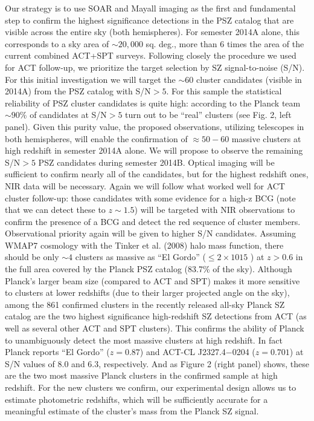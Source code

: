 \documentclass[apj, revtex4]{emulateapj}
\begin{document}
Our strategy is to use SOAR and Mayall imaging as the first and fundamental step to confirm
the highest significance detections in the PSZ catalog that are visible across the entire sky (both
hemispheres). For semester 2014A alone, this corresponds to a sky area of $\sim20,000$ sq. deg., more
than 6 times the area of the current combined ACT+SPT surveys. Following closely the procedure
we used for ACT follow-up, we prioritize the target selection by SZ signal-to-noise (S/N). For this
initial investigation we will target the $\sim60$ cluster candidates (visible in 2014A) from the PSZ
catalog with S/N$>5$. For this sample the statistical reliability of PSZ cluster candidates is quite
high: according to the Planck team $\sim90$\% of candidates at S/N$>5$ turn out to be “real” clusters
(see Fig. 2, left panel). Given this purity value, the proposed observations, utilizing telescopes in
both hemispheres, will enable the confirmation of $\approx 50 − 60$ massive clusters at high redshift in
semester 2014A alone. We will propose to observe the remaining S/N$>5$ PSZ candidates during
semester 2014B.
Optical imaging will be sufficient to confirm nearly all of the candidates, but for the highest redshift
ones, NIR data will be necessary. Again we will follow what worked well for ACT cluster follow-up:
those candidates with some evidence for a high-z BCG (note that we can detect these to $z \sim 1.5$)
will be targeted with NIR observations to confirm the presence of a BCG and detect the red
sequence of cluster members. Observational priority again will be given to higher S/N candidates.
Assuming WMAP7 cosmology with the Tinker et al. (2008) halo mass function, there should be
only $\sim4$ clusters as massive as “El Gordo” ($\leq 2 \times 10 15$ \Msol) at $z > 0.6$ in the full area covered by
the Planck PSZ catalog (83.7\% of the sky). Although Planck’s larger beam size (compared to ACT
and SPT) makes it more sensitive to clusters at lower redshifts (due to their larger projected angle
on the sky), among the 861 confirmed clusters in the recently released all-sky Planck SZ catalog are
the two highest significance high-redshift SZ detections from ACT (as well as several other ACT
and SPT clusters). This confirms the ability of Planck to unambiguously detect the most massive
clusters at high redshift. In fact Planck reports “El Gordo” ($z = 0.87$) and ACT-CL J2327.4−0204
($z = 0.701$) at S/N values of 8.0 and 6.3, respectively. And as Figure 2 (right panel) shows, these
are the two most massive Planck clusters in the confirmed sample at high redshift. For the new
clusters we confirm, our experimental design allows us to estimate photometric redshifts, which will
be sufficiently accurate for a meaningful estimate of the cluster’s mass from the Planck SZ signal.
\end{document}
